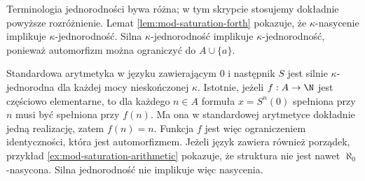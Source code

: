 Terminologia jednorodności bywa różna; w tym skrypcie
stosujemy dokładnie powyższe rozróżnienie.
Lemat \ref{lem:mod-saturation-forth} pokazuje, że
$\kappa$-nasycenie implikuje $\kappa$-jednorodność.
Silna $\kappa$-jednorodność implikuje $\kappa$-jednorodność,
ponieważ automorfizm można ograniczyć do $A\cup\{a\}$.

\begin{przyklad}
\label{ex:mod-homogeneity-not-saturation}
Standardowa arytmetyka w języku zawierającym $0$ i
następnik $S$ jest silnie $\kappa$-jednorodna dla każdej
mocy nieskończonej $\kappa$. Istotnie, jeżeli $f:A\to\N$
jest częściowo elementarne, to dla każdego $n\in A$
formuła $x=S^n(0)$ spełniona przy $n$ musi być spełniona
przy $f(n)$. Ma ona w standardowej arytmetyce dokładnie
jedną realizację, zatem $f(n)=n$. Funkcja $f$ jest więc
ograniczeniem identyczności, która jest automorfizmem.
Jeżeli język zawiera również porządek, przykład
\ref{ex:mod-saturation-arithmetic} pokazuje, że struktura
nie jest nawet $\aleph_0$-nasycona. Silna jednorodność nie
implikuje więc nasycenia.
\end{przyklad}

